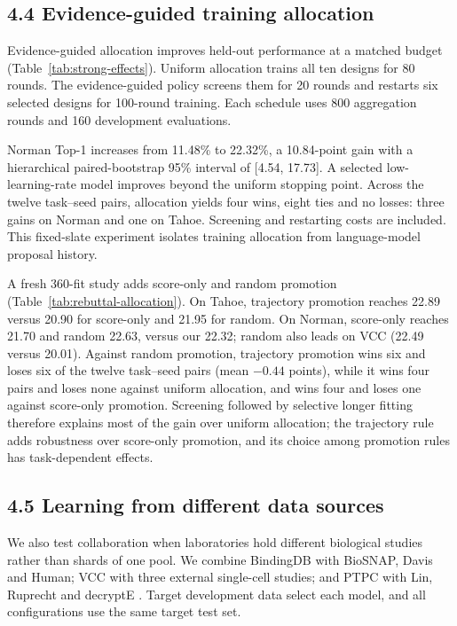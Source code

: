 \subsection*{4.4 Evidence-guided training allocation}
Evidence-guided allocation improves held-out performance at a matched budget (Table~\ref{tab:strong-effects}). Uniform allocation trains all ten designs for 80 rounds. The evidence-guided policy screens them for 20 rounds and restarts six selected designs for 100-round training. Each schedule uses 800 aggregation rounds and 160 development evaluations.


Norman Top-1 increases from 11.48\% to 22.32\%, a 10.84-point gain with a hierarchical paired-bootstrap 95\% interval of [4.54, 17.73]. A selected low-learning-rate model improves beyond the uniform stopping point. Across the twelve task--seed pairs, allocation yields four wins, eight ties and no losses: three gains on Norman and one on Tahoe. Screening and restarting costs are included. This fixed-slate experiment isolates training allocation from language-model proposal history.

A fresh 360-fit study adds score-only and random promotion (Table~\ref{tab:rebuttal-allocation}). On Tahoe, trajectory promotion reaches 22.89 versus 20.90 for score-only and 21.95 for random. On Norman, score-only reaches 21.70 and random 22.63, versus our 22.32; random also leads on VCC (22.49 versus 20.01). Against random promotion, trajectory promotion wins six and loses six of the twelve task--seed pairs (mean $-0.44$ points), while it wins four pairs and loses none against uniform allocation, and wins four and loses one against score-only promotion. Screening followed by selective longer fitting therefore explains most of the gain over uniform allocation; the trajectory rule adds robustness over score-only promotion, and its choice among promotion rules has task-dependent effects.

\subsection*{4.5 Learning from different data sources}
We also test collaboration when laboratories hold different biological studies rather than shards of one pool. We combine BindingDB with BioSNAP, Davis and Human; VCC with three external single-cell studies; and PTPC with Lin, Ruprecht and decryptE \citep{Lin2026HDAC,Ruprecht2020Proteome,Eckert2024DecryptE}. Target development data select each model, and all configurations use the same target test set.

